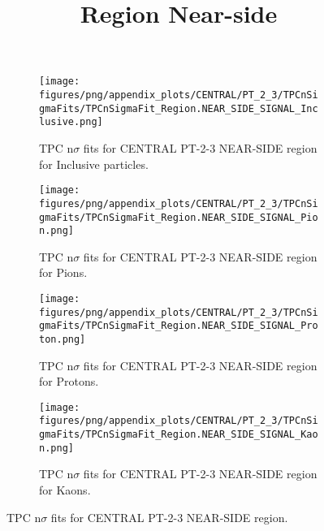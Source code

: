             \begin{figure}[H]
                \title{Region Near-side}
                \begin{subfigure}[b]{0.5\textwidth}
                    \centering
                    \texttt{[image: figures/png/appendix\_plots/CENTRAL/PT\_2\_3/TPCnSigmaFits/TPCnSigmaFit\_Region.NEAR\_SIDE\_SIGNAL\_Inclusive.png]}
                    \caption{TPC n$\sigma$ fits for CENTRAL PT-2-3 NEAR-SIDE region for Inclusive particles.}
                    \label{fig:appendix_CENTRAL_PT-2-3_NEAR_SIDE_SIGNAL_Inclusive}
                \end{subfigure}
                \begin{subfigure}[b]{0.5\textwidth}
                    \centering
                    \texttt{[image: figures/png/appendix\_plots/CENTRAL/PT\_2\_3/TPCnSigmaFits/TPCnSigmaFit\_Region.NEAR\_SIDE\_SIGNAL\_Pion.png]}
                    \caption{TPC n$\sigma$ fits for CENTRAL PT-2-3 NEAR-SIDE region for Pions.}
                    \label{fig:appendix_CENTRAL_PT-2-3_NEAR_SIDE_SIGNAL_Pion}
                \end{subfigure}
                \begin{subfigure}[b]{0.5\textwidth}
                    \centering
                    \texttt{[image: figures/png/appendix\_plots/CENTRAL/PT\_2\_3/TPCnSigmaFits/TPCnSigmaFit\_Region.NEAR\_SIDE\_SIGNAL\_Proton.png]}
                    \caption{TPC n$\sigma$ fits for CENTRAL PT-2-3 NEAR-SIDE region for Protons.}
                    \label{fig:appendix_CENTRAL_PT-2-3_NEAR_SIDE_SIGNAL_Proton}
                \end{subfigure}
                \begin{subfigure}[b]{0.5\textwidth}
                    \centering
                    \texttt{[image: figures/png/appendix\_plots/CENTRAL/PT\_2\_3/TPCnSigmaFits/TPCnSigmaFit\_Region.NEAR\_SIDE\_SIGNAL\_Kaon.png]}
                    \caption{TPC n$\sigma$ fits for CENTRAL PT-2-3 NEAR-SIDE region for Kaons.}
                    \label{fig:appendix_CENTRAL_PT-2-3_NEAR_SIDE_SIGNAL_Kaon}
                \end{subfigure}
                \caption{TPC n$\sigma$ fits for CENTRAL PT-2-3 NEAR-SIDE region.}
                \label{fig:appendix_CENTRAL_PT-2-3_NEAR_SIDE_SIGNAL}
            \end{figure}
